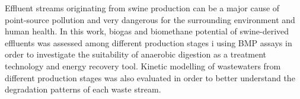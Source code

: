 Effluent streams originating from swine production can be a major cause of point-source pollution and very dangerous for the surrounding environment and human health. In this work, biogas and biomethane potential of swine-derived effluents was assessed among different production stages i using BMP assays in order to investigate the suitability of anaerobic digestion as a treatment technology and energy recovery tool. Kinetic modelling of wastewaters from different production stages was also evaluated in order to better understand the degradation patterns of each waste stream.